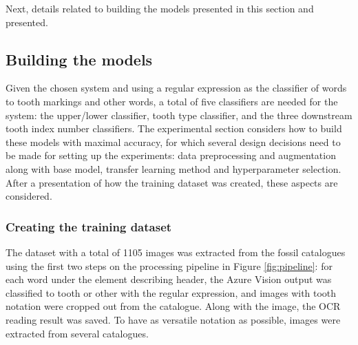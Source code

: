 \documentclass{article}
\begin{document}
Next, details related to building the models presented in this section and 
presented.

\subsection{Building the models}
\label{sect:building-models}


Given the chosen system and using a regular expression as the classifier of words to tooth markings 
and other words, a total of five classifiers are needed for the system: the upper/lower classifier, 
tooth type classifier, and the three downstream tooth index number classifiers. The experimental 
section considers how to build these models with maximal accuracy, for which several design decisions 
need to be made for setting up the experiments: data preprocessing and augmentation along with base model,
transfer learning method and hyperparameter selection. After a presentation of  how the training dataset was created, these aspects are considered.

\subsubsection{Creating the training dataset}

The dataset with a total of 1105 images was extracted from the fossil 
catalogues using the first two steps on the processing pipeline in Figure \ref{fig:pipeline}:
for each word under the element describing header, the Azure Vision output was classified 
to tooth or other with the regular expression, and 
images with tooth notation were cropped out from the catalogue. Along with the image, the 
OCR reading result was saved. To have as versatile notation as possible, images were 
extracted from several catalogues.  
\end{document}
